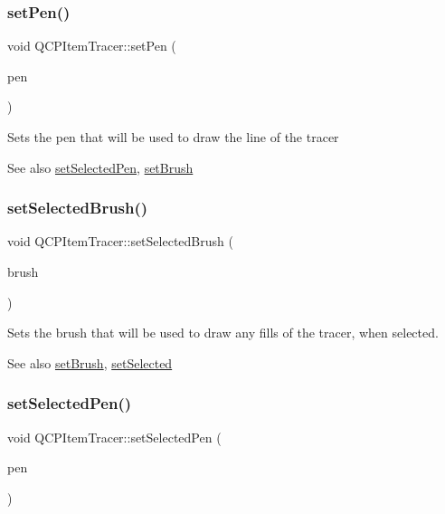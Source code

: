 \subsubsection{\texorpdfstring{setPen()}{setPen()}}
{\footnotesize\ttfamily void Q\+C\+P\+Item\+Tracer\+::set\+Pen (\begin{DoxyParamCaption}\item[{const Q\+Pen \&}]{pen }\end{DoxyParamCaption})}

Sets the pen that will be used to draw the line of the tracer

\begin{DoxySeeAlso}{See also}
\mbox{\hyperlink{class_q_c_p_item_tracer_ae1bf70db7f13f928660168cd3e5069f3}{set\+Selected\+Pen}}, \mbox{\hyperlink{class_q_c_p_item_tracer_a2c303f7470a30084daa201ed556b3c36}{set\+Brush}} 
\end{DoxySeeAlso}
\mbox{\label{class_q_c_p_item_tracer_a0f55c084980a7a312af859d3e7b558ef}} 
\subsubsection{\texorpdfstring{setSelectedBrush()}{setSelectedBrush()}}
{\footnotesize\ttfamily void Q\+C\+P\+Item\+Tracer\+::set\+Selected\+Brush (\begin{DoxyParamCaption}\item[{const Q\+Brush \&}]{brush }\end{DoxyParamCaption})}

Sets the brush that will be used to draw any fills of the tracer, when selected.

\begin{DoxySeeAlso}{See also}
\mbox{\hyperlink{class_q_c_p_item_tracer_a2c303f7470a30084daa201ed556b3c36}{set\+Brush}}, \mbox{\hyperlink{class_q_c_p_abstract_item_a203de94ad586cc44d16c9565f49d3378}{set\+Selected}} 
\end{DoxySeeAlso}
\mbox{\label{class_q_c_p_item_tracer_ae1bf70db7f13f928660168cd3e5069f3}} 
\subsubsection{\texorpdfstring{setSelectedPen()}{setSelectedPen()}}
{\footnotesize\ttfamily void Q\+C\+P\+Item\+Tracer\+::set\+Selected\+Pen (\begin{DoxyParamCaption}\item[{const Q\+Pen \&}]{pen }\end{DoxyParamCaption})}

